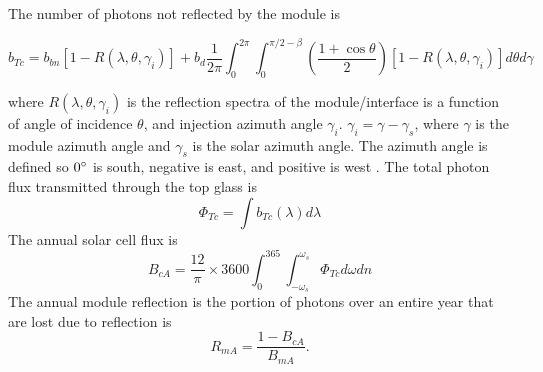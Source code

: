 \documentclass[preprint,12pt]{elsarticle}
\begin{document}


 




The number of photons not reflected by the module is

\begin{equation}
b_{Tc} =  b_{bn}  \left [ 1 - R(\lambda, \theta, \gamma_i) \right ]  +  
 b_d \frac{1}{2 \pi } \int_{0}^{2 \pi} \int_{0}^{\pi/2 - \beta} \left ( \frac{1 + \cos \theta}{2} \right ) \left [ 1 - R(\lambda, \theta, \gamma_i)  \right ] d \theta d \gamma
\end{equation}

where $R(\lambda, \theta, \gamma_i)$ is the reflection spectra of the module/interface is a function of 
angle of incidence $\theta$, and injection azimuth angle $\gamma_i$. 
$\gamma_i = \gamma - \gamma_s$, where $\gamma$ is the module azimuth angle and $\gamma_s$ is the solar azimuth angle.  
The azimuth angle is defined so $0 \degree$ is south,   negative is east, and positive is west \cite{Duffie:13}.  
The total photon flux transmitted through the top glass is 
\begin{equation}
\Phi_{Tc} = \int b_{Tc} (\lambda) d \lambda
\end{equation}
The annual solar cell flux is 
\begin{equation}
B_{cA} = \frac{12}{\pi} \times 3600 \int_{0}^{365} \int_{-\omega_s} ^{\omega_s} \Phi_{Tc} d \omega d n 
\end{equation}
The annual module reflection is the portion of photons over an entire year that are lost due to 
reflection is 
\begin{equation}
R_{mA} = \frac{1 - B_{cA} }{B_{mA}}.
\end{equation}
\end{document}
